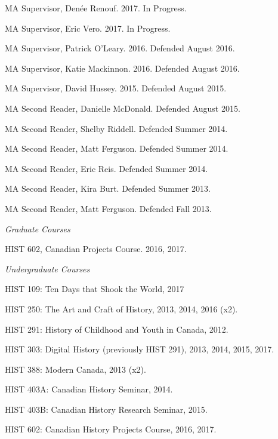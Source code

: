 \documentclass[11pt,article,oneside]{memoir}
\begin{document}
\ind MA Supervisor, Den\'ee Renouf. 2017. In Progress.

\ind MA Supervisor, Eric Vero. 2017. In Progress.

\ind MA Supervisor, Patrick O'Leary. 2016. Defended August 2016.

\ind MA Supervisor, Katie Mackinnon. 2016. Defended August 2016.

\ind MA Supervisor, David Hussey. 2015. Defended August 2015.

\ind MA Second Reader, Danielle McDonald. Defended August 2015.

\ind MA Second Reader, Shelby Riddell. Defended Summer 2014.

\ind MA Second Reader, Matt Ferguson. Defended Summer 2014.

\ind MA Second Reader, Eric Reis. Defended Summer 2014.

\ind MA Second Reader, Kira Burt. Defended Summer 2013.

\ind MA Second Reader, Matt Ferguson. Defended Fall 2013.

\medskip
\noindent\emph{Graduate Courses \vspace{0.05in}}

\ind HIST 602, Canadian Projects Course. 2016, 2017.

\medskip

\noindent\emph{Undergraduate Courses \vspace{0.05in}}

\ind HIST 109: Ten Days that Shook the World, 2017

\ind HIST 250: The Art and Craft of History, 2013, 2014, 2016 (x2).

\ind HIST 291: History of Childhood and Youth in Canada, 2012.

\ind HIST 303: Digital History (previously HIST 291), 2013, 2014, 2015, 2017.

\ind HIST 388: Modern Canada, 2013 (x2).

\ind HIST 403A: Canadian History Seminar, 2014.

\ind HIST 403B: Canadian History Research Seminar, 2015.

\ind HIST 602: Canadian History Projects Course, 2016, 2017.
\end{document}
